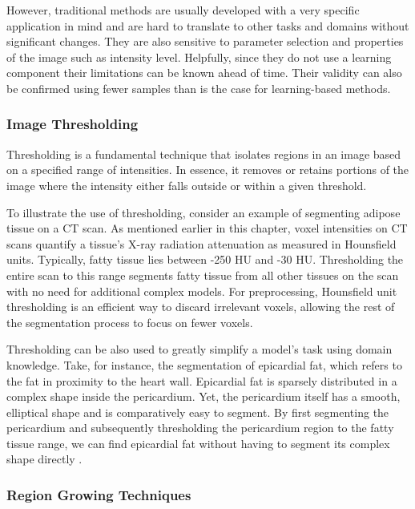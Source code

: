 However, traditional methods are usually developed with a very specific application in mind and are hard to translate to other tasks and domains without significant changes. They are also sensitive to parameter selection and properties of the image such as intensity level. Helpfully, since they do not use a learning component their limitations can be known ahead of time. Their validity can also be confirmed using fewer samples than is the case for learning-based methods.

\subsubsection{Image Thresholding}

Thresholding is a fundamental technique that isolates regions in an image based on a specified range of intensities. In essence, it removes or retains portions of the image where the intensity either falls outside or within a given threshold.

To illustrate the use of thresholding, consider an example of segmenting adipose tissue on a CT scan. As mentioned earlier in this chapter, voxel intensities on CT scans quantify a tissue's X-ray radiation attenuation as measured in Hounsfield units. Typically, fatty tissue lies between -250 HU and -30 HU. Thresholding the entire scan to this range segments fatty tissue from all other tissues on the scan with no need for additional complex models. For preprocessing, Hounsfield unit thresholding is an efficient way to discard irrelevant voxels, allowing the rest of the segmentation process to focus on fewer voxels.

Thresholding can be also used to greatly simplify a model's task using domain knowledge. Take, for instance, the segmentation of epicardial fat, which refers to the fat in proximity to the heart wall. Epicardial fat is sparsely distributed in a complex shape inside the pericardium. Yet, the pericardium itself has a smooth, elliptical shape and is comparatively easy to segment. By first segmenting the pericardium and subsequently thresholding the pericardium region to the fatty tissue range, we can find epicardial fat without having to segment its complex shape directly \cite{bencevicRecentProgressEpicardial2022}.

\subsubsection{Region Growing Techniques}

